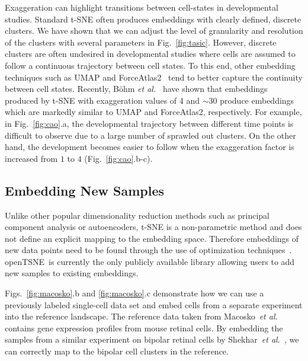 \documentclass[twocolumn]{bmcart}
\newcommand{\opentsne}{\textsf{openTSNE}}
\begin{document}
Exaggeration can highlight transitions between cell-states in
developmental studies. Standard t-SNE often produces embeddings with
clearly defined, discrete clusters. We have shown that we can adjust the level
of granularity and resolution of the clusters with several parameters in Fig.~\ref{fig:tasic}. However,
discrete clusters are often undesired in developmental studies where cells are assumed to follow a continuous trajectory between cell states. To this end, other
embedding techniques such as UMAP and ForceAtlas2~\cite{jacomy2014forceatlas2} tend to better capture the continuity between cell
states. Recently, B{\"o}hm \textit{et al.}~\cite{bohm2020unifying} have shown that embeddings
produced by t-SNE with exaggeration values of 4 and $\sim30$ produce embeddings
which are markedly similar to UMAP and ForceAtlas2, respectively. For example,
in Fig.~\ref{fig:cao}.a, the developmental trajectory between different time
points is difficult to observe due to a large number of sprawled out clusters.
On the other hand, the development becomes easier to follow when the
exaggeration factor is increased from $1$ to $4$ (Fig.~\ref{fig:cao}.b-c). 

\subsection*{Embedding New Samples}

Unlike other popular dimensionality reduction methods such as principal
component analysis or autoencoders, t-SNE is a non-parametric method and does
not define an explicit mapping to the embedding space. Therefore embeddings of
new data points need to be found through the use of optimization
techniques~\cite{policar2019embedding}. \opentsne\ is currently the only
publicly available library allowing users to add new samples to existing
embeddings.

Figs.~\ref{fig:macosko}.b and \ref{fig:macosko}.c demonstrate how we can use a
previously labeled single-cell data set and embed cells from a separate
experiment into the reference landscape. The reference data taken from Macosko~\textit{et al.}~\cite{macosko2015highly} contains gene expression profiles from
mouse retinal cells. By embedding the samples from a similar experiment on bipolar retinal cells by Shekhar~\textit{et al.}~\cite{shekhar2016comprehensive}, 
we can correctly map to the bipolar cell clusters in the reference.
\end{document}
